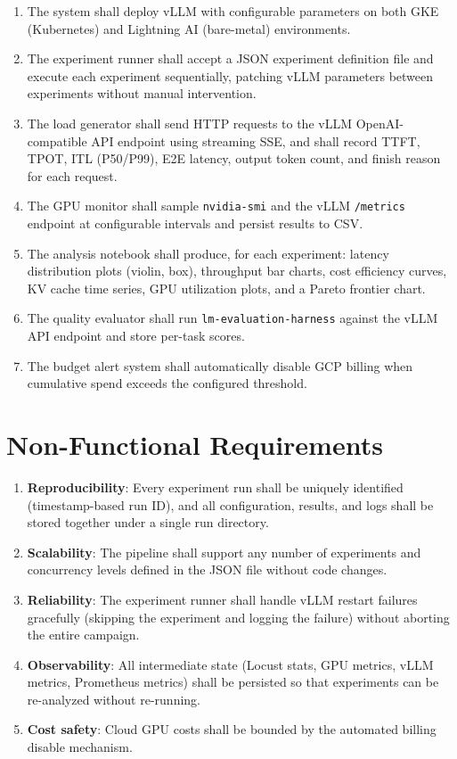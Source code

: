 \documentclass[a4paper,12pt]{report}
\begin{document}
\begin{enumerate}
    \item The system shall deploy vLLM with configurable parameters on both GKE (Kubernetes) and Lightning AI (bare-metal) environments.
    \item The experiment runner shall accept a JSON experiment definition file and execute each experiment sequentially, patching vLLM parameters between experiments without manual intervention.
    \item The load generator shall send HTTP requests to the vLLM OpenAI-compatible API endpoint using streaming SSE, and shall record TTFT, TPOT, ITL (P50/P99), E2E latency, output token count, and finish reason for each request.
    \item The GPU monitor shall sample \texttt{nvidia-smi} and the vLLM \texttt{/metrics} endpoint at configurable intervals and persist results to CSV.
    \item The analysis notebook shall produce, for each experiment: latency distribution plots (violin, box), throughput bar charts, cost efficiency curves, KV cache time series, GPU utilization plots, and a Pareto frontier chart.
    \item The quality evaluator shall run \texttt{lm-evaluation-harness} against the vLLM API endpoint and store per-task scores.
    \item The budget alert system shall automatically disable GCP billing when cumulative spend exceeds the configured threshold.
\end{enumerate}

\section{Non-Functional Requirements}

\begin{enumerate}
    \item \textbf{Reproducibility}: Every experiment run shall be uniquely identified (timestamp-based run ID), and all configuration, results, and logs shall be stored together under a single run directory.
    \item \textbf{Scalability}: The pipeline shall support any number of experiments and concurrency levels defined in the JSON file without code changes.
    \item \textbf{Reliability}: The experiment runner shall handle vLLM restart failures gracefully (skipping the experiment and logging the failure) without aborting the entire campaign.
    \item \textbf{Observability}: All intermediate state (Locust stats, GPU metrics, vLLM metrics, Prometheus metrics) shall be persisted so that experiments can be re-analyzed without re-running.
    \item \textbf{Cost safety}: Cloud GPU costs shall be bounded by the automated billing disable mechanism.
\end{enumerate}
\end{document}
